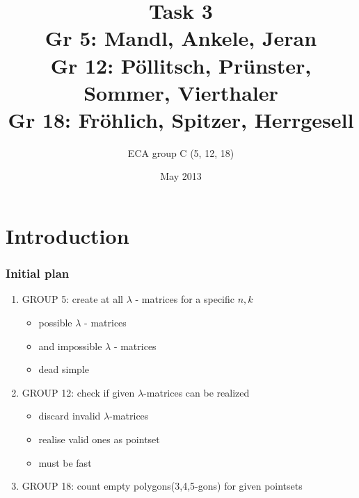 \documentclass{beamer}
\title{Task 3 \\ \small{Gr 5: Mandl, Ankele, Jeran\\Gr 12: P\"ollitsch, Pr\"unster, Sommer, Vierthaler\\Gr 18: Fr\"ohlich, Spitzer, Herrgesell}}
\author{ECA group C (5, 12, 18)}
\date{May 2013}
\begin{document}
\begin{frame}[plain]
	\titlepage
\end{frame}

\section{Introduction}
\begin{frame}
\frametitle{Initial plan}
\begin{enumerate}
\item GROUP 5: create at all  $\lambda$ - matrices for a specific $n,k$
  \begin{itemize}
  \item possible $\lambda$ - matrices
  \item and impossible $\lambda$ - matrices
  \item dead simple
  \end{itemize}
\item GROUP 12: check if given $\lambda$-matrices can be realized
  \begin{itemize}
  \item discard invalid $\lambda$-matrices
  \item realise valid ones as pointset
  \item must be fast
  \end{itemize}
\item GROUP 18: count empty polygons(3,4,5-gons) for given pointsets
\end{enumerate}
\end{frame}

\end{document}

